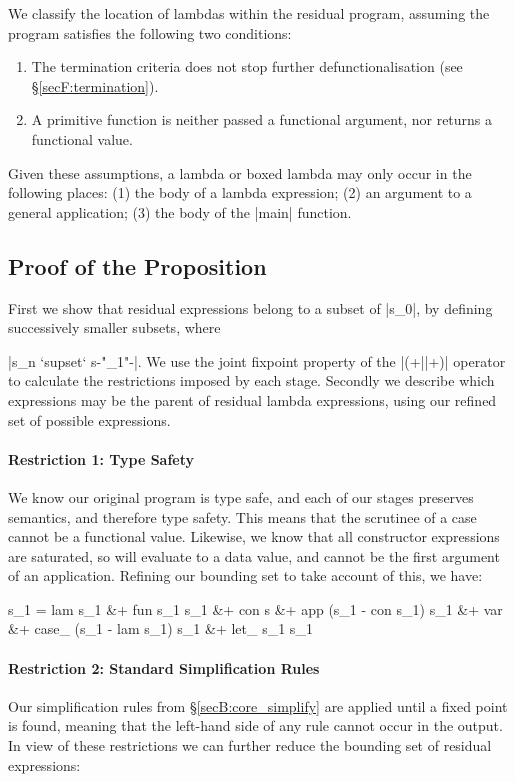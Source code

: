 We classify the location of lambdas within the residual program, assuming the program satisfies the following two conditions:

\begin{enumerate}
\item The termination criteria does not stop further defunctionalisation (see \S\ref{secF:termination}).
\item A primitive function is neither passed a functional argument, nor returns a functional value.
\end{enumerate}

Given these assumptions, a lambda or boxed lambda may only occur in the following places: (1) the body of a lambda expression; (2) an argument to a general application; (3) the body of the |main| function.

\subsection{Proof of the Proposition}

First we show that residual expressions belong to a subset of |s_0|, by defining successively smaller subsets, where \ignore|s_n `supset` s{-"_{\text{\tiny{+}}1}"-}|. We use the joint fixpoint property of the |(+||+)| operator to calculate the restrictions imposed by each stage. Secondly we describe which expressions may be the parent of residual lambda expressions, using our refined set of possible expressions.

\paragraph{Restriction 1: Type Safety}
We know our original program is type safe, and each of our stages preserves semantics, and therefore type safety. This means that the scrutinee of a case cannot be a functional value. Likewise, we know that all constructor expressions are saturated, so will evaluate to a data value, and cannot be the first argument of an application. Refining our bounding set to take account of this, we have:

\ignore\begin{code}
s_1  =  lam s_1 &+ fun s_1 s_1 &+ con s &+ app (s_1 - con s_1) s_1 &+ var &+
        case_ (s_1 - lam s_1) s_1 &+ let_ s_1 s_1
\end{code}

\paragraph{Restriction 2: Standard Simplification Rules}
Our simplification rules from \S\ref{secB:core_simplify} are applied until a fixed point is found, meaning that the left-hand side of any rule cannot occur in the output. In view of these restrictions we can further reduce the bounding set of residual expressions:

